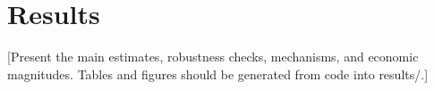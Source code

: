 \section{Results}

[Present the main estimates, robustness checks, mechanisms, and economic magnitudes. Tables and figures should be generated from code into results/.]
